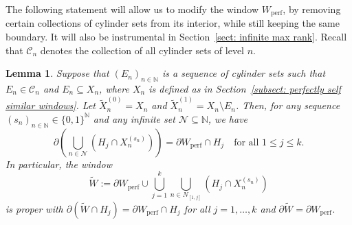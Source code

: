 \documentclass[titlepage,reqno,10pt]{amsart}
\newtheorem{lemma}[theorem]{Lemma}
\theoremstyle{definition}
\def\N{{\mathbb N}}
\newcommand{\tm}{\subseteq}
\newcommand{\kl}{\left(}
\newcommand{\kr}{\right)}
\begin{document}
The following statement will allow us to modify the window $W_\mathrm{perf}$, by removing certain collections of cylinder sets from its interior, while still keeping the same boundary. It will also be instrumental in Section~\ref{sect: infinite max rank}. Recall that $\mathcal{C}_n$ denotes the collection of all cylinder sets of level $n$. 

\begin{lemma}\label{lem: modified window boundary} 
    Suppose that $(E_n)_{n\in\N}$ is a sequence of cylinder sets such that $E_n \in \mathcal{C}_n$ and $E_n\tm X_n$, where $X_n$ is defined as in Section~\ref{subsect: perfectly self similar windows}.
    Let $\widetilde{X}_n^{(0)} = X_n$ and $\widetilde{X}_n^{(1)}=X_n \setminus E_n$.
    Then, for any sequence $(s_n)_{n\in\N} \in \{0,1\}^\N$ and any infinite set $\mathcal{N}\tm \N$, we have 
    $$ \partial \kl \bigcup_{n\in \mathcal{N}} (H_j \cap {X}_n^{(s_n)})\kr = \partial W_{\mathrm{perf}} \cap H_j \quad \text{for all } 1\leq j\leq k.$$
    In particular, the window
    $$ \widetilde{W} := \partial W_{\mathrm{perf}} \cup \bigcup_{j=1}^k \bigcup_{n\in N_{[1,j]}} (H_j\cap {X}_n^{(s_n)})$$
    is proper with $\partial(\widetilde{W}\cap H_j) = \partial W_{\mathrm{perf}}\cap H_j$ for all $j=1,\ldots, k$ and $\partial\widetilde{W} = \partial W_{\mathrm{perf}}$.
\end{lemma}
\end{document}
